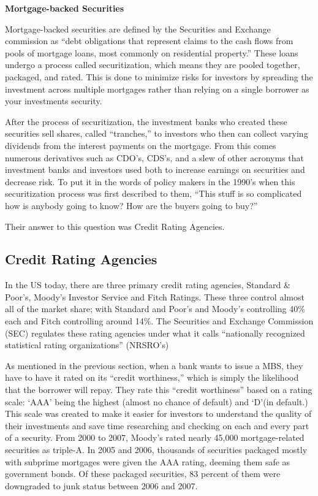 \documentclass[11pt]{article}
\begin{document}
\begin{multicols}{2}
\textbf{Mortgage-backed Securities}

Mortgage-backed securities are defined by the Securities and Exchange commission as ``debt obligations that represent claims to the cash flows from pools of mortgage loans, most commonly on residential property.'' \cite{secMBS} These loans undergo a process called securitization, which means they are pooled together, packaged, and rated.  This is done to minimize risks for investors by spreading the investment across multiple mortgages rather than relying on a single borrower as your investments security. \cite{MBSInfo}

After the process of securitization, the investment banks who created these securities sell shares, called ``tranches,'' to investors who then can collect varying dividends from the interest payments on the mortgage.  From this comes numerous derivatives such as CDO's, CDS's, and a slew of other acronyms that investment banks and investors used both to increase earnings on securities and decrease risk. \cite{MBSInfo}\cite[p.73]{govtReport} To put it in the words of policy makers in the 1990's when this securitization process was first described to them, ``This stuff is so complicated how is anybody going to know? How are the buyers going to buy?'' \cite[p.~68]{govtReport}  

Their answer to this question was Credit Rating Agencies.

\subsection{Credit Rating Agencies}
In the US today, there are three primary credit rating agencies, Standard \& Poor's, Moody's Investor Service and Fitch Ratings.  These three control almost all of the market share; with Standard and Poor's and Moody's controlling 40\% each and Fitch controlling around 14\%. \cite{wpMoodies}  The Securities and Exchange Commission (SEC) regulates these rating agencies under what it calls ``nationally recognized statistical rating organizations'' (NRSRO's) \cite{CivilLiability} 

As mentioned in the previous section, when a bank wants to issue a MBS, they have to have it rated on its ``credit worthiness,'' which is simply the likelihood that the borrower will repay.  They rate this ``credit worthiness'' based on a rating scale: `AAA' being the highest (almost no chance of default) and `D'(in default.)  \cite{CivilLiability}  This scale was created to make it easier for investors to understand the quality of their investments and save time researching and checking on each and every part of a security.  From 2000 to 2007, Moody's rated nearly 45,000 mortgage-related securities as triple-A. \cite[p.~xxv]{govtReport} In 2005 and 2006, thousands of securities packaged mostly with subprime mortgages were given the AAA rating, deeming them safe as government bonds.  Of these packaged securities, 83 percent of them were downgraded to junk status between 2006 and 2007. \cite[p.~xxv]{govtReport}\cite{ratingEthics}  


\end{multicols}
\end{document}
